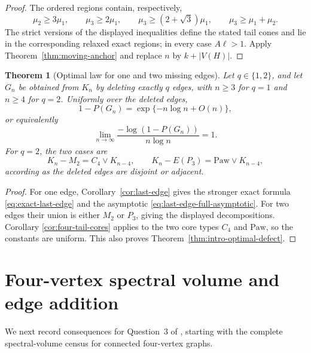 \documentclass[11pt,reqno]{amsart}
\newtheorem{theorem}{Theorem}[section]
\theoremstyle{definition}
\theoremstyle{remark}
\begin{document}
\begin{proof}
The ordered regions contain, respectively,
\[
  \mu_2\ge3\mu_1,\qquad
  \mu_3\ge2\mu_1,\qquad
  \mu_3\ge(2+\sqrt3)\mu_1,\qquad
  \mu_3\ge\mu_1+\mu_2.
\]
The strict versions of the displayed inequalities define the stated tail cones and lie in
the corresponding relaxed exact regions; in every case $A\ell>1$.  Apply
Theorem~\ref{thm:moving-anchor} and replace
$n$ by $k+|V(H)|$.
\end{proof}

\begin{theorem}[Optimal law for one and two missing edges]
\label{thm:optimal-defect}
Let $q\in\{1,2\}$, and let $G_n$ be obtained from $K_n$ by deleting exactly
$q$ edges, with $n\ge3$ for $q=1$ and $n\ge4$ for $q=2$.  Uniformly over
the deleted edges,
\begin{equation}\label{eq:defect-one-two-law}
  1-P(G_n)=\exp\{-n\log n+O(n)\},
\end{equation}
or equivalently
\[
  \lim_{n\to\infty}\frac{-\log(1-P(G_n))}{n\log n}=1.
\]
For $q=2$, the two cases are
\[
  K_n-M_2=C_4\vee K_{n-4},\qquad
  K_n-E(P_3)=\mathrm{Paw}\vee K_{n-4},
\]
according as the deleted edges are disjoint or adjacent.
\end{theorem}

\begin{proof}
For one edge, Corollary~\ref{cor:last-edge} gives the stronger exact formula
\eqref{eq:exact-last-edge} and the asymptotic
\eqref{eq:last-edge-full-asymptotic}.  For two edges their union is either
$M_2$ or $P_3$, giving the displayed decompositions.  Corollary
\ref{cor:four-tail-cores} applies to the two core types $C_4$ and
$\mathrm{Paw}$, so the constants are uniform.
This also proves Theorem~\ref{thm:intro-optimal-defect}.
\end{proof}

\section{Four-vertex spectral volume and edge addition}
\label{sec:edge-addition}

We next record consequences for Question~3 of \cite{EJT2026}, starting with
the complete spectral-volume census for connected four-vertex graphs.
\end{document}
